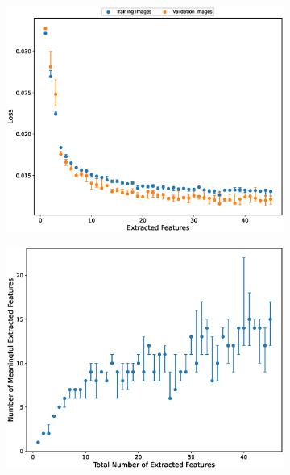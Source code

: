 \documentclass[12pt, onecolumn]{article}
\begin{document}
    \begin{figure}[H]
        \centering
        \begin{subfigure}[b]{0.49\textwidth}
            \centering
            \includegraphics[width=\textwidth]{Images/rand_extracted_feat_vs_loss.eps}
            \caption{}
            \label{extracted_feature_loss}
        \end{subfigure}
        \begin{subfigure}[b]{0.49\textwidth}
            \centering
            \includegraphics[width=\textwidth]{Images/rand_meaningful_extracted_features.eps}

\end{subfigure}
\end{figure}
\end{document}
